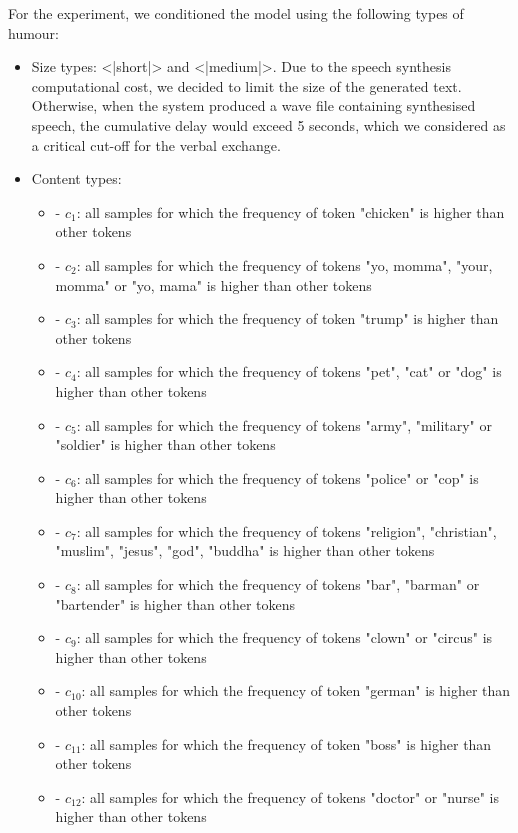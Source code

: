 For the experiment, we conditioned the model using the following types of humour:
\begin{itemize}
    \item Size types: <|short|> and <|medium|>. Due to the speech synthesis computational cost, we decided to limit the size of the generated text. Otherwise, when the system produced a wave file containing synthesised speech, the cumulative delay would exceed 5 seconds, which we considered as a critical cut-off for the verbal exchange.
    \item Content types:
    \begin{itemize}
        \item <|chicken|> - \( c_1\): all samples for which the frequency of token "chicken" is higher than other tokens
        \item <|momma|> - \( c_2\): all samples for which the frequency of tokens "yo, momma", "your, momma" or "yo, mama" is higher than other tokens
        \item <|trump|> - \( c_3\): all samples for which the frequency of token "trump" is higher than other tokens
        \item <|pet|> - \( c_4\): all samples for which the frequency of tokens "pet", "cat" or "dog" is higher than other tokens
        \item <|army|> - \( c_5\): all samples for which the frequency of tokens "army", "military" or "soldier" is higher than other tokens
        \item <|police|> - \( c_6\): all samples for which the frequency of tokens "police" or "cop" is higher than other tokens 
        \item <|religion|> - \( c_7\): all samples for which the frequency of tokens "religion", "christian", "muslim", "jesus", "god", "buddha" is higher than other tokens
        \item <|bar|> - \( c_8\): all samples for which the frequency of tokens "bar", "barman" or "bartender" is higher than other tokens
        \item <|clown|> - \( c_9\): all samples for which the frequency of tokens "clown" or "circus" is higher than other tokens
        \item <|german|> - \( c_10\): all samples for which the frequency of token "german" is higher than other tokens
        \item <|boss|> - \( c_11\): all samples for which the frequency of token "boss" is higher than other tokens
        \item <|doctor|> - \( c_12\): all samples for which the frequency of tokens "doctor" or "nurse" is higher than other tokens

\end{itemize}
\end{itemize}

